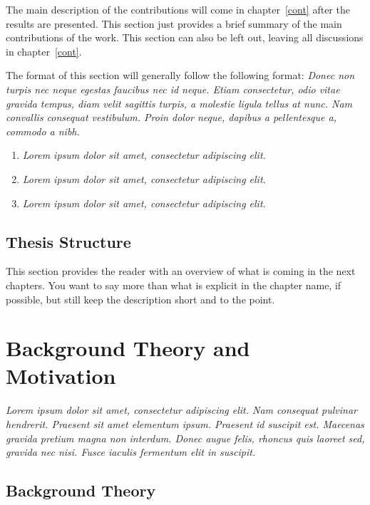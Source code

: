 \documentclass[a4paper]{book}
\begin{document}
The main description of the contributions will come in chapter~\ref{cont} after the results are presented. This section just provides a brief summary of the main contributions of the work. This section can also be left out, leaving all discussions in chapter~\ref{cont}.

The format of this section will generally follow the following format:
{\it
Donec non turpis nec neque egestas faucibus nec id neque. Etiam consectetur, odio vitae gravida tempus, diam velit sagittis turpis, a molestie ligula tellus at nunc. Nam convallis consequat vestibulum. Proin dolor neque, dapibus a pellentesque a, commodo a nibh.}

\begin{enumerate}
\item {\it Lorem ipsum dolor sit amet, consectetur adipiscing elit.}
\item {\it Lorem ipsum dolor sit amet, consectetur adipiscing elit.}
\item {\it Lorem ipsum dolor sit amet, consectetur adipiscing elit.}
\end{enumerate}


\section{Thesis Structure}
\label{sec:thesisStructure}

This section provides the reader with an overview of what is coming in the next chapters. You want to say more than what is explicit in the chapter name, if possible, but still keep the description short and to the point. 


\chapter{Background Theory and Motivation}\label{T-B}
\label{cha:TheoryAndBackground}

{\it Lorem ipsum dolor sit amet, consectetur adipiscing elit. Nam consequat pulvinar hendrerit. Praesent sit amet elementum ipsum. Praesent id suscipit est. Maecenas gravida pretium magna non interdum. Donec augue felis, rhoncus quis laoreet sed, gravida nec nisi. Fusce iaculis fermentum elit in suscipit.}


\section{Background Theory}
\label{sec:no1}
\end{document}

